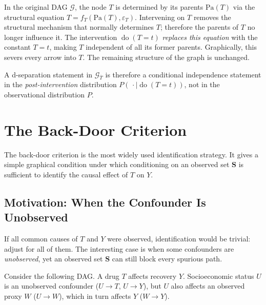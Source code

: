 \documentclass[
  a4paper,
]{book}
\newcommand{\doop}{\operatorname{do}}
\newcommand{\Gcal}{\mathcal{G}}
\newcommand{\Pa}{\mathrm{Pa}}
\begin{document}
\begin{tcolorbox}[enhanced jigsaw, arc=.35mm, bottomrule=.15mm, bottomtitle=1mm, breakable, colback=white, colbacktitle=quarto-callout-note-color!10!white, colframe=quarto-callout-note-color-frame, coltitle=black, left=2mm, leftrule=.75mm, opacityback=0, opacitybacktitle=0.6, rightrule=.15mm, title={The Intervention Principle}, titlerule=0mm, toprule=.15mm, toptitle=1mm]

In the original DAG \(\Gcal\), the node \(T\) is determined by its
parents \(\Pa(T)\) via the structural equation
\(T = f_T(\Pa(T), \varepsilon_T)\). Intervening on \(T\) removes the
structural mechanism that normally determines \(T\); therefore the
parents of \(T\) no longer influence it. The intervention
\(\doop(T{=}t)\) \emph{replaces this equation} with the constant
\(T = t\), making \(T\) independent of all its former parents.
Graphically, this severs every arrow into \(T\). The remaining structure
of the graph is unchanged.

A d-separation statement in \(\Gcal_{\overline{T}}\) is therefore a
conditional independence statement in the \emph{post-intervention}
distribution \(P(\,\cdot \mid \doop(T{=}t))\), not in the observational
distribution \(P\).

\end{tcolorbox}

\section{The Back-Door Criterion}\label{sec-backdoor}

The back-door criterion is the most widely used identification strategy.
It gives a simple graphical condition under which conditioning on an
observed set \(\mathbf{S}\) is sufficient to identify the causal effect
of \(T\) on \(Y\).

\subsection{Motivation: When the Confounder Is
Unobserved}\label{motivation-when-the-confounder-is-unobserved}

If all common causes of \(T\) and \(Y\) were observed, identification
would be trivial: adjust for all of them. The interesting case is when
some confounders are \emph{unobserved}, yet an observed set
\(\mathbf{S}\) can still block every spurious path.

Consider the following DAG. A drug \(T\) affects recovery \(Y\).
Socioeconomic status \(U\) is an unobserved confounder (\(U \to T\),
\(U \to Y\)), but \(U\) also affects an observed proxy \(W\)
(\(U \to W\)), which in turn affects \(Y\) (\(W \to Y\)).
\end{document}
